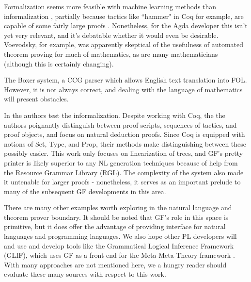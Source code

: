 Formalization seems more feasible with machine learning methods than
informalization , partially because tactics like ``hammer" in Coq for example,
are capable of some fairly large proofs \cite{czajka2018hammer} . Nonetheless,
for the Agda developer this isn't yet very relevant, and it's debatable whether
it would even be desirable. Voevodsky, for example, was apparently skeptical of
the usefulness of automated theorem proving for much of mathematics, as are many
mathematicians (although this is certainly changing).

The Boxer system, a CCG parser \cite{bos-etal-2004-wide} which allows English
text translation into FOL. However, it is not always correct, and dealing with
the language of mathematics will present obstacles. 

In \cite{proofFrom} the authors test the informalization. Despite working with
Coq, the the authors poignantly distinguish between proof scripts, sequences of
tactics, and proof objects, and focus on natural deduction proofs. Since Coq is
equipped with notions of Set, Type, and Prop, their methods make distinguishing
between these possibly easier. This work only focuses on linearization of trees,
and GF's pretty printer is likely superior to any NL generation techniques
because of help from the Resource Grammar Library (RGL). The complexity of the system also made it
untenable for larger proofs - nonetheless, it serves as an important prelude to
many of the subsequent GF developments in this area.

There are many other examples worth exploring in the natural language and
theorem prover boundary. It should be noted that GF's role in this space is
primitive, but it does offer the advantage of providing interface for natural
languages and programming languages. We also hope other PL developers will and
use and develop tools like the Grammatical Logical Inference Framework (GLIF),
which uses GF as a front-end for the Meta-Meta-Theory framework
\cite{schaefer2020glif}. With many approaches are not mentioned here, we a
hungry reader should evaluate these many sources with respect to this work.